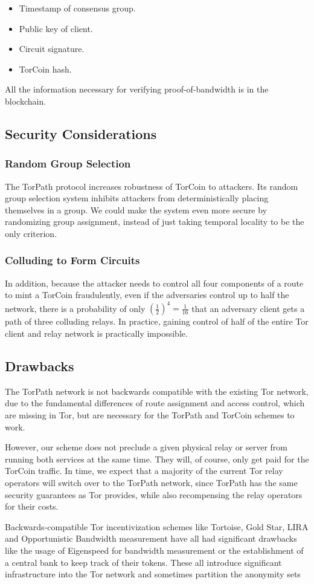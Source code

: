 \begin{itemize}
\item Timestamp of consensus group.
\item Public key of client.
\item Circuit signature.
\item TorCoin hash.
\end{itemize}

All the information necessary for verifying proof-of-bandwidth is in the blockchain. 

\subsection{Security Considerations}

\subsubsection{Random Group Selection}
The TorPath protocol increases robustness of TorCoin to attackers. Its random group selection system inhibits attackers from deterministically placing themselves in a group. We could make the system even more secure by randomizing group assignment, instead of just taking temporal locality to be the only criterion.

\subsubsection{Colluding to Form Circuits}
In addition, because the attacker needs to control all four components of a route to mint a TorCoin fraudulently, even if the adversaries control up to half the network, there is a probability of only $(\frac{1}{2})^4 = \frac{1}{16}$ that an adversary client gets a path of three colluding relays. In practice, gaining control of half of the entire Tor client and relay network is practically impossible. 

\subsection{Drawbacks}
The TorPath network is not backwards compatible with the existing Tor network, due to the fundamental differences of route assignment and access control, which are missing in Tor, but are necessary for the TorPath and TorCoin schemes to work.

However, our scheme does not preclude a given physical relay or server from running both services at the same time. They will, of course, only get paid for the TorCoin traffic. In time, we expect that a majority of the current Tor relay operators will switch over to the TorPath network, since TorPath has the same security guarantees as Tor provides, while also recompensing the relay operators for their costs.

Backwards-compatible Tor incentivization schemes like Tortoise\cite{acsac11-tortoise}, Gold Star\cite{incentives-fc10}, LIRA and Opportunistic Bandwidth measurement have all had significant drawbacks like the usage of Eigenspeed for bandwidth measurement or the establishment of a central bank to keep track of their tokens. These all introduce significant infrastructure into the Tor network and sometimes partition the anonymity sets